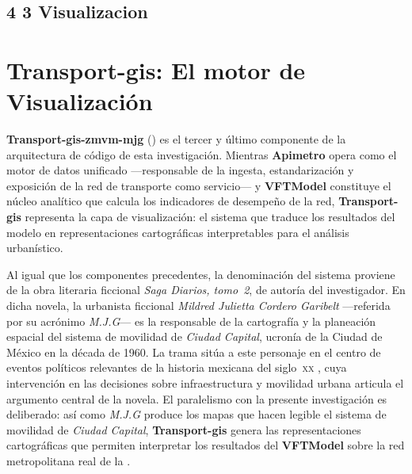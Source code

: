 
\subsection*{4 3 Visualizacion}

\section{Transport-gis: El motor de Visualización}
\label{sec:transport-gis-intro}

\textbf{Transport-gis-zmvm-mjg} () 
es el tercer y último componente de la arquitectura de código de esta investigación. Mientras \textbf{Apimetro} 
opera como el motor de datos unificado —responsable de la ingesta, estandarización y exposición de la red de transporte 
como servicio— y \textbf{VFTModel} constituye el núcleo analítico que calcula los indicadores de desempeño de la red, 
\textbf{Transport-gis} representa la capa de visualización: el sistema que traduce los resultados del modelo en 
representaciones cartográficas interpretables para el análisis urbanístico.

Al igual que los componentes precedentes, la denominación del sistema proviene de la obra literaria ficcional 
\textit{Saga Diarios, tomo~2}, de autoría del investigador. En dicha novela, la urbanista ficcional 
\textit{Mildred Julietta Cordero Garibelt} —referida por su acrónimo \textit{M.J.G}— es la responsable de la cartografía 
y la planeación espacial del sistema de movilidad de \textit{Ciudad Capital}, ucronía de la Ciudad de México en la década de 1960. 
La trama sitúa a este personaje en el centro de eventos políticos relevantes de la historia mexicana del siglo~\textsc{xx} 
\parencite{lopezmateos2023comoelcantodelcisne}, cuya intervención en las decisiones sobre infraestructura y movilidad urbana articula 
el argumento central de la novela. El paralelismo con la presente investigación es deliberado: así como \textit{M.J.G} produce 
los mapas que hacen legible el sistema de movilidad de \textit{Ciudad Capital}, \textbf{Transport-gis} genera las representaciones 
cartográficas que permiten interpretar los resultados del \textbf{VFTModel} sobre la red metropolitana real de la \zmvm.

